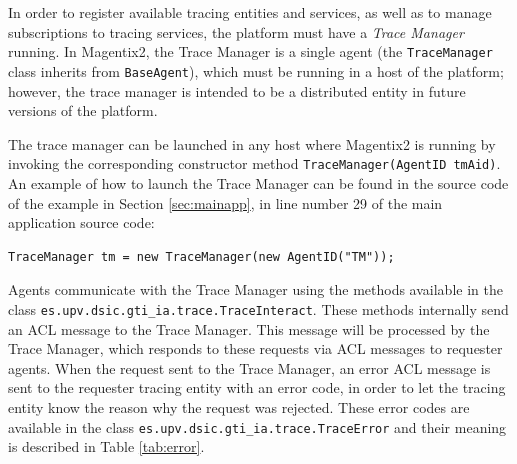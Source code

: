 	In order to register available tracing entities and services, as well as to manage subscriptions to
	tracing services, the platform must have a \textit{Trace Manager} running. In Magentix2, the Trace
	Manager is a single agent (the \texttt{TraceManager} class inherits from \texttt{BaseAgent}), which
	must be running in a host of the platform; however, the trace manager is intended to be a distributed
	entity in future versions of the platform.

	The trace manager can be launched in any host where Magentix2 is running by invoking the
	corresponding constructor method \lstinline{TraceManager(AgentID tmAid)}. An example of how to
	launch the Trace Manager can be found in the source code of the example in
	Section \ref{sec:mainapp}, in line number 29 of the main application source code:

	\begin{lstlisting}
TraceManager tm = new TraceManager(new AgentID("TM"));
	\end{lstlisting}

	Agents communicate with the Trace Manager using the methods available in the class
	\lstinline{es.upv.dsic.gti_ia.trace.TraceInteract}. These methods internally send an ACL message to
	the Trace Manager. This message will be processed by the Trace Manager, which responds to these
	requests via ACL messages to requester agents. When the request sent to the Trace Manager, an
	error ACL message is sent to the requester tracing entity with an error code, in order to let the tracing
	entity know the reason why the request was rejected. These error codes are available in the class
	\lstinline{es.upv.dsic.gti_ia.trace.TraceError} and their meaning is described in Table \ref{tab:error}.

